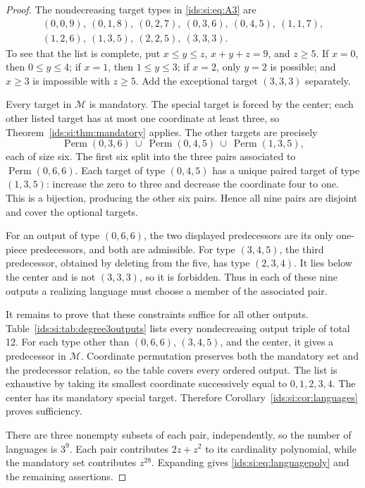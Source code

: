 \documentclass[11pt,letterpaper]{article}
\theoremstyle{definition}\newtheorem{definition}[theorem]{Definition}
\theoremstyle{remark}\newtheorem{remark}[theorem]{Remark}
\theoremstyle{definition}\newtheorem{question}[theorem]{Question}
\begin{document}
\begin{proof}
The nondecreasing target types in \eqref{ids:si:eq:A3} are
\[
\begin{gathered}
 (0,0,9),\ (0,1,8),\ (0,2,7),\ (0,3,6),\ (0,4,5),\ (1,1,7),\\
 (1,2,6),\ (1,3,5),\ (2,2,5),\ (3,3,3).
\end{gathered}
\]
To see that the list is complete, put $x\leq y\leq z$, $x+y+z=9$,
and $z\geq5$. If $x=0$, then $0\leq y\leq4$; if $x=1$, then
$1\leq y\leq3$; if $x=2$, only $y=2$ is possible; and $x\geq3$ is
impossible with $z\geq5$. Add the exceptional target $(3,3,3)$ separately.

Every target in $\mathcal M$ is mandatory. The special target is forced by
the center; each other listed target has at most one coordinate at least
three, so Theorem~\ref{ids:si:thm:mandatory} applies. The other targets are precisely
\[
 \operatorname{Perm}(0,3,6)\ \cup\
 \operatorname{Perm}(0,4,5)\ \cup\
 \operatorname{Perm}(1,3,5),
\]
each of size six. The first six split into the three pairs associated to
$\operatorname{Perm}(0,6,6)$. Each target of type $(0,4,5)$ has a unique
paired target of type $(1,3,5)$: increase the zero to three and decrease
the coordinate four to one. This is a bijection, producing the other six
pairs. Hence all nine pairs are disjoint and cover the optional targets.

For an output of type $(0,6,6)$, the two displayed predecessors are its only
one-piece predecessors, and both are admissible. For type $(3,4,5)$, the
third predecessor, obtained by deleting from the five, has type $(2,3,4)$.
It lies below the center and is not $(3,3,3)$, so it is forbidden. Thus in
each of these nine outputs a realizing language must choose a member of
the associated pair.

It remains to prove that these constraints suffice for all other outputs.
Table~\ref{ids:si:tab:degree3outputs} lists every nondecreasing output triple of total
12. For each type other than $(0,6,6)$, $(3,4,5)$, and the center, it gives
a predecessor in $\mathcal M$. Coordinate permutation preserves both the
mandatory set and the predecessor relation, so the table covers every
ordered output. The list is exhaustive by taking its smallest coordinate
successively equal to $0,1,2,3,4$. The center has its mandatory special
target. Therefore Corollary~\ref{ids:si:cor:languages} proves sufficiency.

There are three nonempty subsets of each pair, independently, so the number
of languages is $3^9$. Each pair contributes $2z+z^2$ to its cardinality
polynomial, while the mandatory set contributes $z^{28}$. Expanding gives
\eqref{ids:si:eq:languagepoly} and the remaining assertions.
\end{proof}
\end{document}
